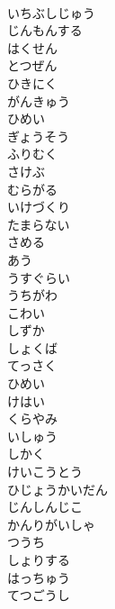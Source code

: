 \documentclass[8pt]{extreport}
\begin{document}
\begin{CJK}{UTF8}{min}
\\	いちぶしじゅう
\\	じんもんする
\\	はくせん
\\	とつぜん
\\	ひきにく
\\	がんきゅう
\\	ひめい
\\	ぎょうそう
\\	ふりむく
\\	さけぶ
\\	むらがる
\\	いけづくり
\\	たまらない
\\	さめる
\\	あう
\\	うすぐらい
\\	うちがわ
\\	こわい
\\	しずか
\\	しょくば
\\	てっさく
\\	ひめい
\\	けはい
\\	くらやみ
\\	いしゅう
\\	しかく
\\	けいこうとう
\\	ひじょうかいだん
\\	じんしんじこ
\\	かんりがいしゃ
\\	つうち
\\	しょりする
\\	はっちゅう
\\	てつごうし
\end{CJK}
\end{document}
